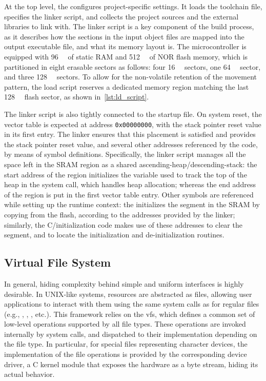 At the top level, the  configures project-specific settings. It loads the toolchain file, specifies the linker script, and collects the project sources and the external libraries to link with.
The linker script is a key component of the build process, as it describes how the sections in the input object files are mapped into the output executable file, and what its memory layout is.
The \mcu microcontroller is equipped with \qty{96}{\kibi\byte} of static RAM and \qty{512}{\kibi\byte} of NOR flash memory, which is partitioned in eight erasable sectors as follows: four \qty{16}{\kibi\byte} sectors, one \qty{64}{\kibi\byte} sector, and three \qty{128}{\kibi\byte} sectors. To allow for the non-volatile retention of the movement pattern, the load script reserves a dedicated memory region matching the last \qty{128}{\kibi\byte} flash sector, as shown in~\cref{lst:ld_script}.

The linker script is also tightly connected to the startup file. On system reset, the vector table is expected at address \texttt{0x00000000}, with the stack pointer reset value in its first entry. The linker ensures that this placement is satisfied and provides the stack pointer reset value, and several other addresses referenced by the code, by means of symbol definitions. Specifically, the linker script manages all the space left in the SRAM region as a shared ascending-heap/descending-stack: the start address of the region initializes the variable used to track the top of the heap in the  system call, which handles heap allocation; whereas the end address of the region is put in the first vector table entry.
Other symbols are referenced while setting up the runtime context: the  initializes the  segment in the SRAM by copying from the flash, according to the addresses provided by the linker; similarly, the C/\cpp initialization code makes use of these addresses to clear the  segment, and to locate the initialization and de-initialization routines.

\subsection{Virtual File System}\label{subsec:files}

In general, hiding complexity behind simple and uniform interfaces is highly desirable. In UNIX-like systems, resources are abstracted as files, allowing user applications to interact with them using the same system calls as for regular files (e.g., , , , etc.). This framework relies on the \ac{vfs}, which defines a common set of low-level operations supported by all file types. These operations are invoked internally by system calls, and dispatched to their implementation depending on the file type. In particular, for special files representing character devices, the implementation of the file operations is provided by the corresponding device driver, a C kernel module that exposes the hardware as a byte stream, hiding its actual behavior.

